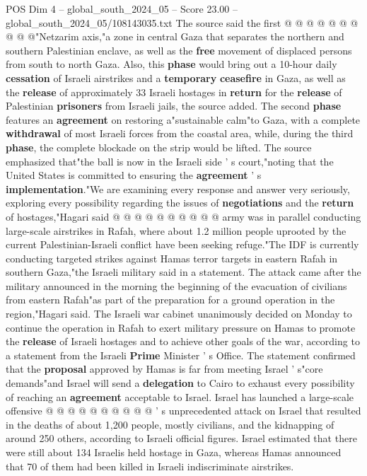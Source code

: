 \begin{textsample}{POS Dim 4 – global\_south\_2024\_05 – Score 23.00 – global\_south\_2024\_05/108143035.txt}
The source said the first @ @ @ @ @ @ @ @ @ @"Netzarim axis,"a zone in central Gaza that separates the northern and southern Palestinian enclave, as well as the \textbf{free} movement of displaced persons from south to north Gaza.
Also, this \textbf{phase} would bring out a 10-hour daily \textbf{cessation} of Israeli airstrikes and a \textbf{temporary} \textbf{ceasefire} in Gaza, as well as the \textbf{release} of approximately 33 Israeli hostages in \textbf{return} for the \textbf{release} of Palestinian \textbf{prisoners} from Israeli jails, the source added.
The second \textbf{phase} features an \textbf{agreement} on restoring a"sustainable calm"to Gaza, with a complete \textbf{withdrawal} of most Israeli forces from the coastal area, while, during the third \textbf{phase}, the complete blockade on the strip would be lifted.
The source emphasized that"the ball is now in the Israeli side ' s court,"noting that the United States is committed to ensuring the \textbf{agreement} ' s \textbf{implementation}."We are examining every response and answer very seriously, exploring every possibility regarding the issues of \textbf{negotiations} and the \textbf{return} of hostages,"Hagari said @ @ @ @ @ @ @ @ @ @ army was in parallel conducting large-scale airstrikes in Rafah, where about 1.2 million people uprooted by the current Palestinian-Israeli conflict have been seeking refuge."The IDF is currently conducting targeted strikes against Hamas terror targets in eastern Rafah in southern Gaza,"the Israeli military said in a statement.
The attack came after the military announced in the morning the beginning of the evacuation of civilians from eastern Rafah"as part of the preparation for a ground operation in the region,"Hagari said.
The Israeli war cabinet unanimously decided on Monday to continue the operation in Rafah to exert military pressure on Hamas to promote the \textbf{release} of Israeli hostages and to achieve other goals of the war, according to a statement from the Israeli \textbf{Prime} Minister ' s Office.
The statement confirmed that the \textbf{proposal} approved by Hamas is far from meeting Israel ' s"core demands"and Israel will send a \textbf{delegation} to Cairo to exhaust every possibility of reaching an \textbf{agreement} acceptable to Israel.
Israel has launched a large-scale offensive @ @ @ @ @ @ @ @ @ @ ' s unprecedented attack on Israel that resulted in the deaths of about 1,200 people, mostly civilians, and the kidnapping of around 250 others, according to Israeli official figures.
Israel estimated that there were still about 134 Israelis held hostage in Gaza, whereas Hamas announced that 70 of them had been killed in Israeli indiscriminate airstrikes.

\end{textsample}
